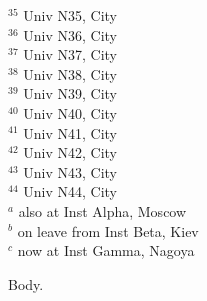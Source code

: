 \documentclass[preprint,11pt]{elsarticle}
\begin{document}
\begin{frontmatter}
{\begin{small}
{$^{35}$ Univ N35, City\\
$^{36}$ Univ N36, City\\
$^{37}$ Univ N37, City\\
$^{38}$ Univ N38, City\\
$^{39}$ Univ N39, City\\
$^{40}$ Univ N40, City\\
$^{41}$ Univ N41, City\\
$^{42}$ Univ N42, City\\
$^{43}$ Univ N43, City\\
$^{44}$ Univ N44, City\\
\vspace{0.2cm}
$^{a}$ also at Inst Alpha, Moscow\\
$^{b}$ on leave from Inst Beta, Kiev\\
$^{c}$ now at Inst Gamma, Nagoya\\
\vspace{7cm}
}
\end{small}
}
\begin{abstract}
A.
\end{abstract}
\end{frontmatter}
Body.
\end{document}

